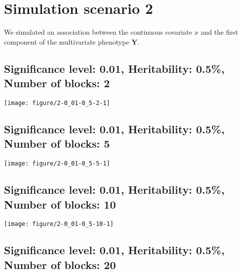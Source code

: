\documentclass[11pt,letter]{article}\usepackage[]{graphicx}\usepackage[]{color}
\makeatletter
\def\maxwidth{ %
  \ifdim\Gin@nat@width>\linewidth
    \linewidth
  \else
    \Gin@nat@width
  \fi
}
\newenvironment{knitrout}{}{} %
\makeatother
\begin{document}
\newpage

\section{Simulation scenario 2}

We simulated an association between the continuous covariate $x$ and the first component of the multivariate phenotype $\mathbf{Y}$.

\newpage




\subsection{Significance level: 0.01, Heritability: 0.5\%, Number of blocks: 2}

\begin{knitrout}
\color{fgcolor}
\texttt{[image: figure/2-0\_01-0\_5-2-1]} 

\end{knitrout}

\newpage
\subsection{Significance level: 0.01, Heritability: 0.5\%, Number of blocks: 5}

\begin{knitrout}
\color{fgcolor}
\texttt{[image: figure/2-0\_01-0\_5-5-1]} 

\end{knitrout}

\newpage
\subsection{Significance level: 0.01, Heritability: 0.5\%, Number of blocks: 10}

\begin{knitrout}
\color{fgcolor}
\texttt{[image: figure/2-0\_01-0\_5-10-1]} 

\end{knitrout}

\newpage
\subsection{Significance level: 0.01, Heritability: 0.5\%, Number of blocks: 20}
\end{document}
